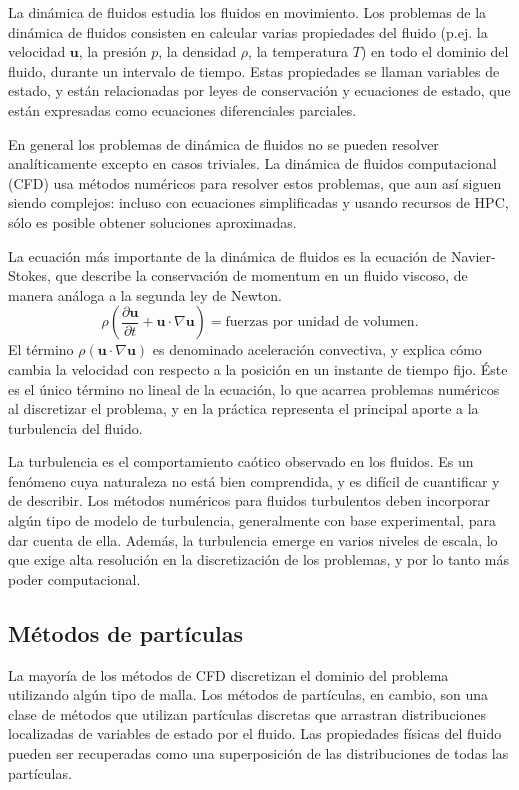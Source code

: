 \documentclass[11pt,spanish]{article}
\newcommand{\vel}{\mathbf{u}}
\begin{document}
La dinámica de fluidos estudia los fluidos en movimiento.  Los problemas de la
dinámica de fluidos consisten en calcular varias propiedades del fluido (p.ej.
la velocidad $\vel$, la presión $p$, la densidad $\rho$, la temperatura $T$) en
todo el dominio del fluido, durante un intervalo de tiempo.  Estas propiedades
se llaman variables de estado, y están relacionadas por leyes de conservación y
ecuaciones de estado, que están expresadas como ecuaciones diferenciales parciales.

En general los problemas de dinámica de fluidos no se pueden resolver
analíticamente excepto en casos triviales.  La dinámica de fluidos computacional
(CFD) usa métodos numéricos para resolver estos problemas, que aun así siguen
siendo complejos:  incluso con ecuaciones simplificadas y usando recursos de
HPC, sólo es posible obtener soluciones aproximadas.

La ecuación más importante de la dinámica de fluidos es la ecuación de
Navier-Stokes, que describe la conservación de momentum en un fluido viscoso,
de manera análoga a la segunda ley de Newton.  
\begin{equation}
    \rho\left(\frac{\partial\vel}{\partial t} + \vel\cdot\nabla\vel \right) =
    \text{fuerzas por unidad de volumen}.
\end{equation}
El término $\rho(\vel\cdot\nabla\vel)$ es denominado aceleración convectiva, y
explica cómo cambia la velocidad con respecto a la posición en un instante de
tiempo fijo.  Éste es el único término no lineal de la ecuación, lo que acarrea
problemas numéricos al discretizar el problema, y en la práctica representa el
principal aporte a la turbulencia del fluido.

La turbulencia es el comportamiento caótico observado en los fluidos.  Es un
fenómeno cuya naturaleza no está bien comprendida, y es difícil de cuantificar y
de describir.  Los métodos numéricos para fluidos turbulentos deben incorporar
algún tipo de modelo de turbulencia, generalmente con base experimental, para
dar cuenta de ella.  Además, la turbulencia emerge en varios niveles de escala,
lo que exige alta resolución en la discretización de los problemas, y por lo
tanto más poder computacional.

\subsection{Métodos de partículas}
La mayoría de los métodos de CFD discretizan el dominio del problema utilizando
algún tipo de malla.  Los métodos de partículas, en cambio, son una clase
de métodos que utilizan partículas discretas que arrastran distribuciones
localizadas de variables de estado por el fluido.  Las propiedades físicas del
fluido pueden ser recuperadas como una superposición de las distribuciones
de todas las partículas.
\end{document}
